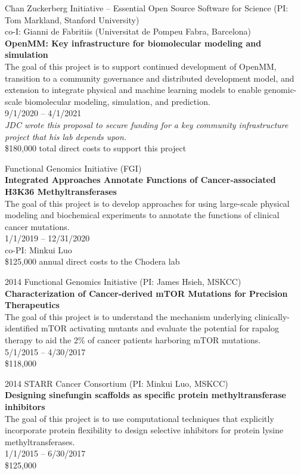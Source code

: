 \documentclass[10pt]{article}
\begin{document}
Chan Zuckerberg Initiative -- Essential Open Source Software for Science (PI: Tom Markland, Stanford University)\\
co-I: Gianni de Fabritiis (Universitat de Pompeu Fabra, Barcelona)\\
{\bf OpenMM: Key infrastructure for biomolecular modeling and simulation}\\
The goal of this project is to support continued development of OpenMM, transition to a community governance and distributed development model, and extension to integrate physical and machine learning models to enable genomic-scale biomolecular modeling, simulation, and prediction.\\
9/1/2020 -- 4/1/2021\\
\emph{JDC wrote this proposal to secure funding for a key community infrastructure project that his lab depends upon.}\\
\$180,000 total direct costs to support this project

Functional Genomics Initiative (FGI)  \\
{\bf Integrated Approaches Annotate Functions of Cancer-associated H3K36 Methyltransferases} \\
The goal of this project is to develop approaches for using large-scale physical modeling and biochemical experiments to annotate the functions of clinical cancer mutations.\\
1/1/2019 -- 12/31/2020 \\
co-PI: Minkui Luo \\
\$125,000 annual direct costs to the Chodera lab

\vspace{1.5ex}

2014 Functional Genomics Initiative (PI: James Hsieh, MSKCC) \\
{\bf Characterization of Cancer-derived mTOR Mutations for Precision Therapeutics} \\
The goal of this project is to understand the mechanism underlying clinically-identified mTOR activating mutants and evaluate the potential for rapalog therapy to aid the 2\% of cancer patients harboring mTOR mutations. \\
5/1/2015 -- 4/30/2017 \\
\$118,000
\color{black}

\vspace{1.5ex}

2014 STARR Cancer Consortium (PI: Minkui Luo, MSKCC) \\
{\bf Designing sinefungin scaffolds as specific protein methyltransferase inhibitors} \\
The goal of this project is to use computational techniques that explicitly incorporate protein flexibility to design selective inhibitors for protein lysine methyltransferases. \\
1/1/2015 -- 6/30/2017 \\
\$125,000
\color{black}
\end{document}
